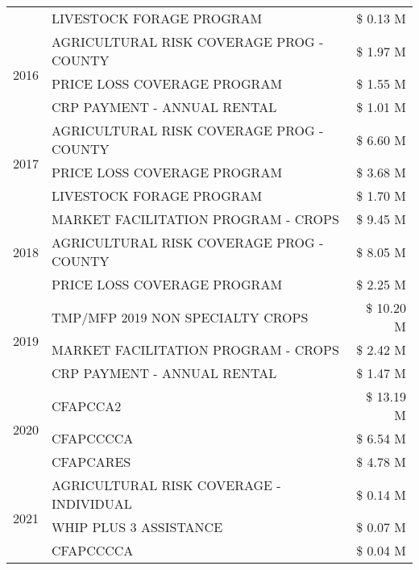 \begin{tabular}{llr}
 & LIVESTOCK FORAGE PROGRAM & \$ 0.13 M \\
\cline{1-3}
\multirow[t]{3}{*}{2016} & AGRICULTURAL RISK COVERAGE PROG - COUNTY & \$ 1.97 M \\
 & PRICE LOSS COVERAGE PROGRAM & \$ 1.55 M \\
 & CRP PAYMENT - ANNUAL RENTAL & \$ 1.01 M \\
\cline{1-3}
\multirow[t]{3}{*}{2017} & AGRICULTURAL RISK COVERAGE PROG - COUNTY & \$ 6.60 M \\
 & PRICE LOSS COVERAGE PROGRAM & \$ 3.68 M \\
 & LIVESTOCK FORAGE PROGRAM & \$ 1.70 M \\
\cline{1-3}
\multirow[t]{3}{*}{2018} & MARKET FACILITATION PROGRAM - CROPS & \$ 9.45 M \\
 & AGRICULTURAL RISK COVERAGE PROG - COUNTY & \$ 8.05 M \\
 & PRICE LOSS COVERAGE PROGRAM & \$ 2.25 M \\
\cline{1-3}
\multirow[t]{3}{*}{2019} & TMP/MFP 2019 NON SPECIALTY CROPS & \$ 10.20 M \\
 & MARKET FACILITATION PROGRAM - CROPS & \$ 2.42 M \\
 & CRP PAYMENT - ANNUAL RENTAL & \$ 1.47 M \\
\cline{1-3}
\multirow[t]{3}{*}{2020} & CFAPCCA2 & \$ 13.19 M \\
 & CFAPCCCCA & \$ 6.54 M \\
 & CFAPCARES & \$ 4.78 M \\
\cline{1-3}
\multirow[t]{3}{*}{2021} & AGRICULTURAL RISK COVERAGE - INDIVIDUAL & \$ 0.14 M \\
 & WHIP PLUS 3 ASSISTANCE & \$ 0.07 M \\
 & CFAPCCCCA & \$ 0.04 M \\
\cline{1-3}
\bottomrule
\end{tabular}
